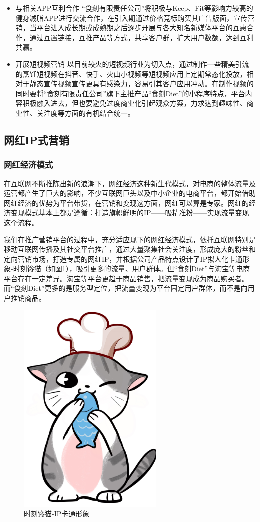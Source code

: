 \documentclass[UTF8,12pt]{ctexart}
\numberwithin{figure}{section}%
\begin{document}
\begin{spacing}{2}
\begin{itemize}
	\item 与相关APP互利合作 
	“食刻有限责任公司”将积极与Keep、Fit等影响力较高的健身减脂APP进行交流合作，在引入期通过价格竞标购买其广告版面，宣传营销，当平台进入成长期或成熟期之后逐步开展与各大知名新媒体平台的互惠合作，通过互置链接，互推产品等方式，共享客户群，扩大用户数额，达到互利共赢。 
	
	\item 开展短视频营销 
	以目前较火的短视频行业为切入点，通过制作一些精美引流的烹饪短视频在抖音、快手、火山小视频等短视频应用上定期常态化投放，相对于静态宣传视频宣传更具有感染力，容易引其客户应用冲动。在制作视频的同时要将“食刻有限责任公司”旗下主推产品“食刻Diet”的小程序特点，平台内容积极融入进去，但也要避免过度商业化引起观众方案，力求达到趣味性、商业性、关注度等方面的有机结合统一。
\end{itemize}

\subsection{网红IP式营销}
\subsubsection{网红经济模式}

在互联网不断推陈出新的浪潮下，网红经济这种新生代模式，对电商的整体流量及运营都产生了巨大的影响，不少互联网巨头以及中小企业的电商平台，都开始借助网红经济的优势为平台带货，在营销和变现这方面，网红可以算是专家。网红的经济变现模式基本上都是遵循：打造旗帜鲜明的IP——吸精准粉——实现流量变现这个流程。

我们在推广营销平台的过程中，充分适应现下的网红经济模式，依托互联网特别是移动互联网传播及其社交平台推广，通过大量聚集社会关注度，形成庞大的粉丝和定向营销市场，打造专属的网红IP，并根据公司产品特点设计了IP拟人化卡通形象-时刻馋猫（如图\ref{IP}），吸引更多的流量、用户群体。但“食刻Diet”与淘宝等电商平台存在一定差异。淘宝等平台更趋于商品销售，把流量变现成为商品购买者。而“食刻Diet”更多的是服务型定位，把流量变现为平台固定用户群体，而不是向用户推销商品。

\begin{figure}[H]
	\centering
	\includegraphics[width=7cm]{fig/IP}
	\caption{时刻馋猫-IP卡通形象}\label{IP}
\end{figure}


\end{spacing}
\end{document}
